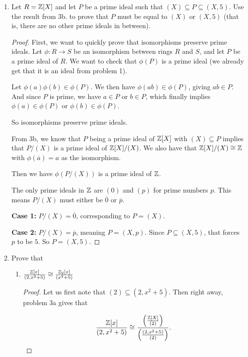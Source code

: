 \documentclass[12pt]{article}
\begin{document}
\begin{enumerate}
\begin{enumerate}
\begin{proof}
			\end{proof}
		\end{enumerate}
	
		
		\item Let $R = \mathbb{Z}[X]$ and let $P$ be a prime ideal such that $(X) \subseteq P \subseteq (X, 5)$. Use the result from 3b. to prove that $P$ must be equal to $(X)$ or $(X, 5)$ (that is, there are no other prime ideals in between).
		\begin{proof}
			First, we want to quickly prove that isomorphisms preserve prime ideals. Let $\phi: R \rightarrow S$ be an isomorphism between rings $R$ and $S$, and let $P$ be a prime ideal of $R$. We want to check that $\phi(P)$ is a prime ideal (we already get that it is an ideal from problem 1).
			
			Let $\phi(a)\phi(b) \in \phi(P)$. We then have $\phi(ab) \in \phi(P)$, giving $ab \in P$. And since $P$ is prime, we have $a \in P$ or $b \in P$, which finally implies $\phi(a) \in \phi(P)$ or $\phi(b) \in \phi(P)$.
			
			So isomorphisms preserve prime ideals.
			
			From 3b, we know that $P$ being a prime ideal of $\mathbb{Z}[X]$ with $(X) \subseteq P$ implies that $P/(X)$ is a prime ideal of $\mathbb{Z}[X]/(X)$. We also have that $\mathbb{Z}[X]/(X) \cong \mathbb{Z}$ with $\phi(\overline{a}) = a$ as the isomorphism.
			
			Then we have $\phi(P/(X))$ is a prime ideal of $\mathbb{Z}$.

			The only prime ideals in $\mathbb{Z}$ are $(0)$ and $(p)$ for prime numbers $p$. This means $P/(X)$ must either be $\overline{0}$ or $\overline{p}$.
			
			\textbf{Case 1:} $P/(X) = \overline{0}$, corresponding to $P = (X)$.
			
			\textbf{Case 2:} $P/(X) = \overline{p}$, meaning $P = (X,p)$. Since $P \subseteq (X,5)$, that forces $p$ to be $5$. So $P = (X,5)$.
		\end{proof}
		
		
		\item Prove that
		\begin{enumerate}
			\item $\frac{\mathbb{Z}[x]}{(2,x^2+5)} \cong \frac{\mathbb{Z}_2[x]}{(x^2+5)}$
			\begin{proof}
				Let us first note that $(2) \subseteq (2, x^2 + 5)$. Then right away, problem 3a gives that 
				
				\[
				\frac{\mathbb{Z}[x]}{(2, x^2+5)} \cong \frac{\left(\frac{\mathbb{Z}[X]}{(2)}\right)}{\left(\frac{(2,x^2+5)}{(2)}\right)}.
				\]
				

\end{proof}
\end{enumerate}
\end{enumerate}
\end{document}
